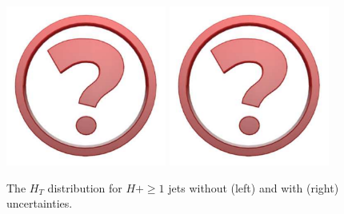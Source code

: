 \begin{figure}[t!]
  \centering
  \includegraphics[width=0.47\textwidth]{Micon.pdf}
  \hfill
  \includegraphics[width=0.47\textwidth]{Micon.pdf}
  \caption{
    The $H_T$ distribution for $H+\ge1$ jets 
    without (left) and with (right) uncertainties.
    \label{fig:higgscomp:results:mobs:HT_all}
  }
\end{figure}

